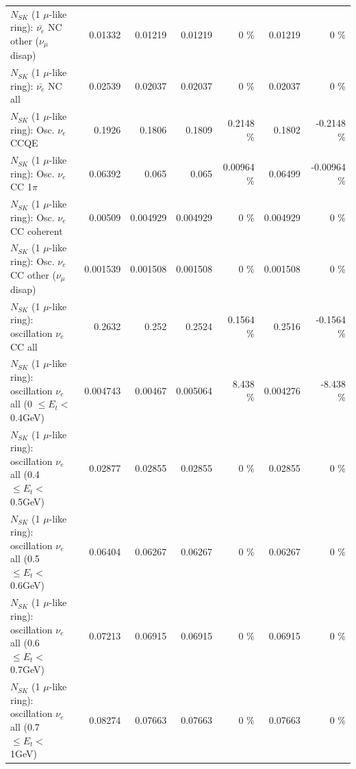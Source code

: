 \begin{table}
\begin{tabular}{| l | r | r | r  r | r  r |}
          $N_{SK}$ (1 $\mu$-like ring): $\bar{\nu_e}$ NC other ($\nu_\mu$ disap) &         0.01332 &         0.01219 &         0.01219 &        0 \%  &         0.01219 &        0 \%  \\ 
                            $N_{SK}$ (1 $\mu$-like ring): $\bar{\nu_{e}}$ NC all &         0.02539 &         0.02037 &         0.02037 &        0 \%  &         0.02037 &        0 \%  \\ 
\hline
\hline
\hline
                                 $N_{SK}$ (1 $\mu$-like ring): Osc. $\nu_e$ CCQE &          0.1926 &          0.1806 &          0.1809 &   0.2148 \%  &          0.1802 &  -0.2148 \%  \\ 
                            $N_{SK}$ (1 $\mu$-like ring): Osc. $\nu_e$ CC 1$\pi$ &         0.06392 &           0.065 &           0.065 &  0.00964 \%  &         0.06499 & -0.00964 \%  \\ 
                          $N_{SK}$ (1 $\mu$-like ring): Osc. $\nu_e$ CC coherent &         0.00509 &        0.004929 &        0.004929 &        0 \%  &        0.004929 &        0 \%  \\ 
           $N_{SK}$ (1 $\mu$-like ring): Osc. $\nu_e$ CC other ($\nu_\mu$ disap) &        0.001539 &        0.001508 &        0.001508 &        0 \%  &        0.001508 &        0 \%  \\ 
                        $N_{SK}$ (1 $\mu$-like ring): oscillation $\nu_e$ CC all &          0.2632 &           0.252 &          0.2524 &   0.1564 \%  &          0.2516 &  -0.1564 \%  \\ 
\hline
$N_{SK}$ (1 $\mu$-like ring): oscillation $\nu_{e}$ all (0 $\leq E_{t} <$ 0.4GeV) &        0.004743 &         0.00467 &        0.005064 &    8.438 \%  &        0.004276 &   -8.438 \%  \\ 
$N_{SK}$ (1 $\mu$-like ring): oscillation $\nu_{e}$ all (0.4 $\leq E_{t} <$ 0.5GeV) &         0.02877 &         0.02855 &         0.02855 &        0 \%  &         0.02855 &        0 \%  \\ 
$N_{SK}$ (1 $\mu$-like ring): oscillation $\nu_{e}$ all (0.5 $\leq E_{t} <$ 0.6GeV) &         0.06404 &         0.06267 &         0.06267 &        0 \%  &         0.06267 &        0 \%  \\ 
$N_{SK}$ (1 $\mu$-like ring): oscillation $\nu_{e}$ all (0.6 $\leq E_{t} <$ 0.7GeV) &         0.07213 &         0.06915 &         0.06915 &        0 \%  &         0.06915 &        0 \%  \\ 
$N_{SK}$ (1 $\mu$-like ring): oscillation $\nu_{e}$ all (0.7 $\leq E_{t} <$ 1GeV) &         0.08274 &         0.07663 &         0.07663 &        0 \%  &         0.07663 &        0 \%  \\ 

\end{tabular}
\end{table}
